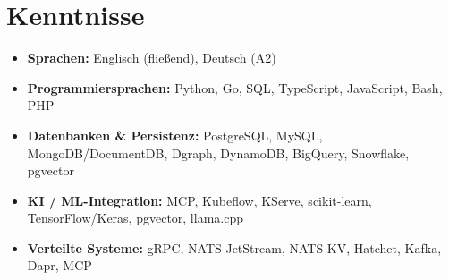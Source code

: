 \documentclass[11pt,a4paper]{resume}
\begin{document}
\section{Kenntnisse}

\begin{itemize}[leftmargin=1.4em,nosep,topsep=2pt]
  \item \textbf{Sprachen:} Englisch (fließend), Deutsch (A2)
  \item \textbf{Programmiersprachen:} Python, Go, SQL, TypeScript, JavaScript, Bash, PHP
  \item \textbf{Datenbanken \& Persistenz:} PostgreSQL, MySQL, MongoDB/DocumentDB, Dgraph, DynamoDB, BigQuery, Snowflake, pgvector
  \item \textbf{KI / ML-Integration:} MCP, Kubeflow, KServe, scikit-learn, TensorFlow/Keras, pgvector, llama.cpp
  \item \textbf{Verteilte Systeme:} gRPC, NATS JetStream, NATS KV, Hatchet, Kafka, Dapr, MCP
\end{itemize}
\end{document}
